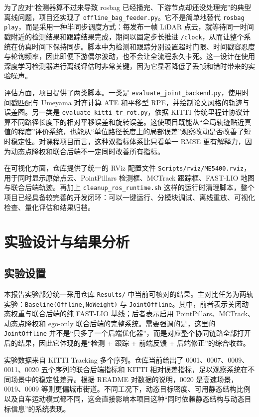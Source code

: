 \documentclass[UTF8,a4paper,12pt]{ctexart}
\begin{document}
为了应对“检测器算不过来导致 rosbag 已经播完、下游节点却还没处理完”的典型离线问题，项目还实现了 \texttt{offline\_bag\_feeder.py}。它不是简单地替代 \texttt{rosbag play}，而是采用一种半同步调度方式：每发布一帧 LiDAR 点云，就等待同一时间戳附近的检测结果和跟踪结果完成，期间以固定步长推进 \texttt{/clock}，从而让整个系统在仿真时间下保持同步。脚本中为检测和跟踪分别设置超时门限、时间戳容忍度与轮询频率，因此即便下游偶尔波动，也不会让全流程永久卡死。这一设计在使用深度学习检测器进行离线评估时非常关键，因为它显著降低了丢帧和错时带来的实验噪声。

评估方面，项目提供了两类脚本。一类是 \texttt{evaluate\_joint\_backend.py}，使用时间戳匹配与 Umeyama 对齐计算 ATE 和平移型 RPE，并绘制论文风格的轨迹与误差图。另一类是 \texttt{evaluate\_kitti\_tr\_rot.py}，依据 KITTI 传统里程计协议计算不同路径长度下的相对平移误差和旋转误差。这使项目既能从“全局轨迹贴近真值的程度”评价系统，也能从“单位路径长度上的局部误差”观察改动是否改善了短时稳定性。对课程项目而言，这种双指标体系比只看单一 RMSE 更有解释力，因为动态点降权和联合后端不一定同时改善所有指标。

在可视化方面，仓库提供了统一的 RViz 配置文件 \texttt{Scripts/rviz/ME5400.rviz}，用于同时显示原始点云、PointPillars 检测框、MCTrack 跟踪框、FAST-LIO 地图与联合后端轨迹。再加上 \texttt{cleanup\_ros\_runtime.sh} 这样的运行时清理脚本，整个项目已经具备较完善的开发闭环：可以一键运行、分模块调试、离线重放、可视化检查、量化评估和结果归档。

\section{实验设计与结果分析}
\subsection{实验设置}
本报告实验部分统一采用仓库 \texttt{Results/} 中当前可核对的结果。主对比任务为两轨实验：\texttt{Baseline(Offline,NoWeight)} 与 \texttt{JointOffline}。其中，前者表示关闭动态权重与联合后端的纯 FAST-LIO 基线；后者表示启用 PointPillars、MCTrack、动态点降权和 ego-only 联合后端的完整系统。需要强调的是，这里的 \texttt{JointOffline} 并不是“只多了一个后端优化器”，而是对应整个协同链路全部打开后的结果，因此它体现的是“检测 + 跟踪 + 前端反馈 + 后端修正”的综合收益。

实验数据来自 KITTI Tracking 多个序列。仓库当前给出了 0001、0007、0009、0011、0020 五个序列的联合后端指标和 KITTI 相对误差指标，足以观察系统在不同场景中的稳定性差异。根据 README 对数据的说明，0020 是高速场景，0019、0009 等则更偏城市街道。不同工况下，动态目标密度、可用静态结构比例以及自车运动模式都不同，这会直接影响本项目这种“同时依赖静态结构与动态目标信息”的系统表现。
\end{document}

